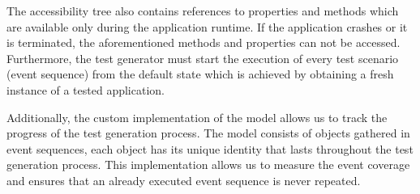 The accessibility tree also contains references to properties and methods which are available only during the application runtime. If the application crashes or it is terminated, the aforementioned methods and properties can not be accessed. Furthermore, the test generator must start the execution of every test scenario (event sequence) from the default state which is achieved by obtaining a fresh instance of a tested application.

Additionally, the custom implementation of the model allows us to track the progress of the test generation process. The model consists of objects gathered in event sequences, each object has its unique identity that lasts throughout the test generation process. This implementation allows us to measure the event coverage and ensures that an already executed event sequence is never repeated.





